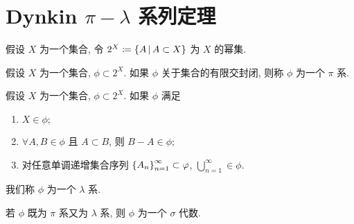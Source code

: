 \section{Dynkin \texorpdfstring{$\pi-\lambda$}{} 系列定理}
假设 $X$ 为一个集合, 令 $2^X\coloneqq\left\{A\,\middle\vert\,A\subset X\right\}$ 为 $X$ 的幂集.\par
假设 $X$ 为一个集合, $\phi\subset 2^X$. 如果 $\phi$ 关于集合的有限交封闭, 则称 $\phi$ 为一个 $\pi$ 系.\par
假设 $X$ 为一个集合, $\phi\subset 2^X$. 如果 $\phi$ 满足
\begin{enumerate}[\rm(1)]
\item $X\in\phi;$
\item $\forall A,B\in\phi$ 且 $A\subset B$, 则 $B-A\in\phi;$
\item 对任意单调递增集合序列 $\left\{A_n\right\}_{n=1}^\infty\subset\varphi$, $\bigcup_{n=1}^\infty\in\phi.$
\end{enumerate}
我们称 $\phi$ 为一个 $\lambda$ 系.
\begin{remark}
若 $\phi$ 既为 $\pi$ 系又为 $\lambda$ 系, 则 $\phi$ 为一个 $\sigma$ 代数.
\end{remark}

